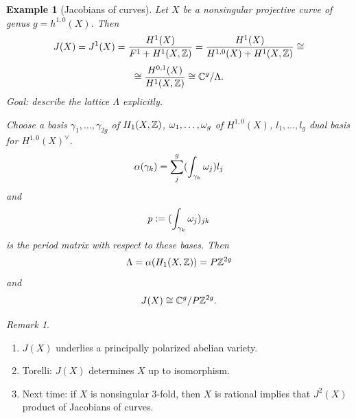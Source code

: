 \documentclass[A4paper, british, reqno]{amsart}
\theoremstyle{darkgreentheorem}
\theoremstyle{darkbluedefinition}
\theoremstyle{darkredexample}
\newtheorem{exa}[thm]{Example}
\theoremstyle{remark}
\newtheorem{rem}[thm]{Remark}
\newcommand{\1}{\mathbbm{1}}
\newcommand{\dual}{^{\vee}}
\begin{document}
\begin{exa}[Jacobians of curves]
    Let $X$ be a nonsingular projective curve of genus $g=h^{1,0}(X)$.
    Then 
    \[ J(X)=J^{1}(X)=\frac{H^{1}(X)}{F^{1}+H^{1}(X,\mathbb{Z})}=\frac{H^{1}(X)}{H^{1,0}(X)+H^{1}(X,\mathbb{Z})}\cong \]
    \[\cong \frac{H^{0,1}(X)}{H^{1}(X,\mathbb{Z})}\cong \mathbb{C}^{g}/\Lambda. \]
    Goal: describe the lattice $\Lambda$ explicitly.
    \begin{center}
    \end{center}
    Choose a basis $\gamma_{1},\ldots,\gamma_{2g}$ of $H_{1}(X,\mathbb{Z})$, $\omega_{1},\ldots,\omega_{g}$ of $H^{1,0}(X)$, $l_{1},\ldots,l_{g}$ dual basis for $H^{1,0}(X)\dual$.
    \[ \alpha(\gamma_{k})=\sum_{j}^{g}(\int_{\gamma_{k}}\omega_{j})l_{j} \]
    and
    \[ p:= (\int_{\gamma_{k}}\omega_{j})_{jk} \]
    is the \textit{period matrix} with respect to these bases.
    Then
    \[ \Lambda=\alpha(H_{1}(X,\mathbb{Z}))=P\mathbb{Z}^{2g} \]
    and 
    \[ J(X)\cong \mathbb{C}^{g}/P\mathbb{Z}^{2g}. \]
\end{exa}

\begin{rem}
    \begin{enumerate}
	\item $J(X)$ underlies a principally polarized abelian variety.
	\item Torelli: $J(X)$ determines $X$ up to isomorphism.
	\item Next time: if $X$ is nonsingular $3$-fold, then $X$ is rational implies that $J^{2}(X)$ product of Jacobians of curves.
    \end{enumerate}
\end{rem}



\end{document}
